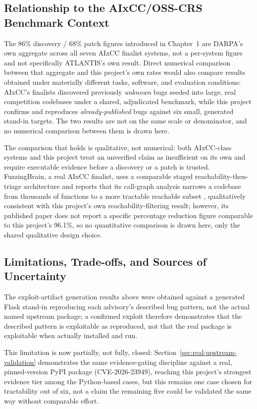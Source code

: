 \documentclass[12pt,a4paper]{report}
\begin{document}
\subsection{Relationship to the AIxCC/OSS-CRS Benchmark Context}
\label{sec:aixcc-comparison}

The 86\% discovery / 68\% patch figures introduced in Chapter~1 are DARPA's own aggregate across all seven AIxCC finalist systems, not a per-system figure and not specifically ATLANTIS's own result. Direct numerical comparison between that aggregate and this project's own rates would also compare results obtained under materially different tasks, software, and evaluation conditions: AIxCC's finalists discovered previously \emph{unknown} bugs seeded into large, real competition codebases under a shared, adjudicated benchmark, while this project confirms and reproduces \emph{already-published} bugs against six small, generated stand-in targets. The two results are not on the same scale or denominator, and no numerical comparison between them is drawn here.

The comparison that holds is qualitative, not numerical: both AIxCC-class systems and this project treat an unverified claim as insufficient on its own and require executable evidence before a discovery or a patch is trusted. FuzzingBrain, a real AIxCC finalist, uses a comparable staged reachability-then-triage architecture and reports that its call-graph analysis narrows a codebase from thousands of functions to a more tractable reachable subset \cite{fuzzingbrain}, qualitatively consistent with this project's own reachability-filtering result; however, its published paper does not report a specific percentage reduction figure comparable to this project's 96.1\%, so no quantitative comparison is drawn here, only the shared qualitative design choice.

\subsection{Limitations, Trade-offs, and Sources of Uncertainty}

The exploit-artifact generation results above were obtained against a generated Flask stand-in reproducing each advisory's described bug pattern, not the actual named upstream package; a confirmed exploit therefore demonstrates that the described pattern is exploitable as reproduced, not that the real package is exploitable when actually installed and run.

This limitation is now partially, not fully, closed: Section~\ref{sec:real-upstream-validation} demonstrates the same evidence-gating discipline against a real, pinned-version PyPI package (CVE-2026-23949), reaching this project's strongest evidence tier among the Python-based cases, but this remains one case chosen for tractability out of six, not a claim the remaining five could be validated the same way without comparable effort.
\end{document}

